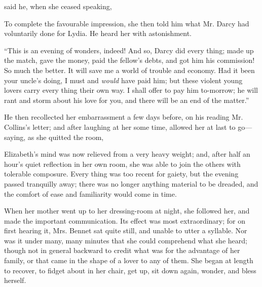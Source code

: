  said he, when she ceased speaking, 

To complete the favourable impression, she then told him what Mr. Darcy had voluntarily done for Lydia. He heard her with astonishment.

“This is an evening of wonders, indeed! And so, Darcy did every thing; made up the match, gave the money, paid the fellow's debts, and got him his commission! So much the better. It will save me a world of trouble and economy. Had it been your uncle's doing, I must and {\em would} have paid him; but these violent young lovers carry every thing their own way. I shall offer to pay him to-morrow; he will rant and storm about his love for you, and there will be an end of the matter.”

He then recollected her embarrassment a few days before, on his reading Mr. Collins's letter; and after laughing at her some time, allowed her at last to go---saying, as she quitted the room, 

Elizabeth's mind was now relieved from a very heavy weight; and, after half an hour's quiet reflection in her own room, she was able to join the others with tolerable composure. Every thing was too recent for gaiety, but the evening passed tranquilly away; there was no longer anything material to be dreaded, and the comfort of ease and familiarity would come in time.

When her mother went up to her dressing-room at night, she followed her, and made the important communication. Its effect was most extraordinary; for on first hearing it, Mrs. Bennet sat quite still, and unable to utter a syllable. Nor was it under many, many minutes that she could comprehend what she heard; though not in general backward to credit what was for the advantage of her family, or that came in the shape of a lover to any of them. She began at length to recover, to fidget about in her chair, get up, sit down again, wonder, and bless herself.


